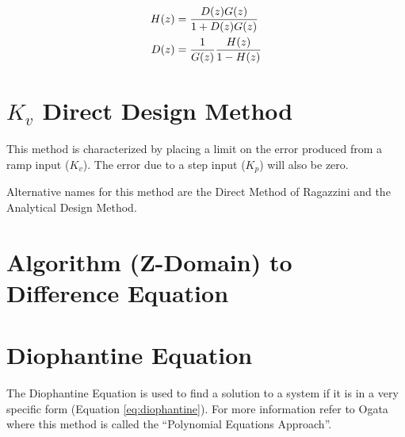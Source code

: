 \documentclass{article}
\newcommand{\sincludepdf}[2][]{
	
}
\begin{document}
\begin{align}
	H(z) &= \frac{D(z)G(z)}{1 + D(z)G(z)} \notag \\
	D(z) &= \frac{1}{G(z)} \frac{H(z)}{1 - H(z)}
\end{align}


\section{$K_v$ Direct Design Method}

This method is characterized by placing a limit on the error
produced from a ramp input ($K_v$).
The error due to a step input ($K_p$) will also be zero.

Alternative names for this method are the Direct Method
of Ragazzini\autocite[Pg. 264]{franklin1998digital} and
the Analytical Design Method\autocite[Pg. 242]{ogata1995discrete}.

\section{Algorithm (Z-Domain) to Difference Equation}

\sincludepdf[pages={11},
			pagecommand=\subsection*{Example 1}
		]{scan/11211301.pdf}

\sincludepdf[pages={12},
			pagecommand=\subsection*{Example 2}
		]{scan/11211301.pdf}

\sincludepdf[pages={13},
			pagecommand=\subsection*{Example 3}
		]{scan/11211301.pdf}

\section{Diophantine Equation}

The Diophantine Equation is used to find a solution to a system
if it is in a very specific form (Equation \ref{eq:diophantine}).
For more information refer to Ogata\autocite[Pg. 525]{ogata1995discrete}
where this method is called the ``Polynomial Equations Approach''.
\end{document}
